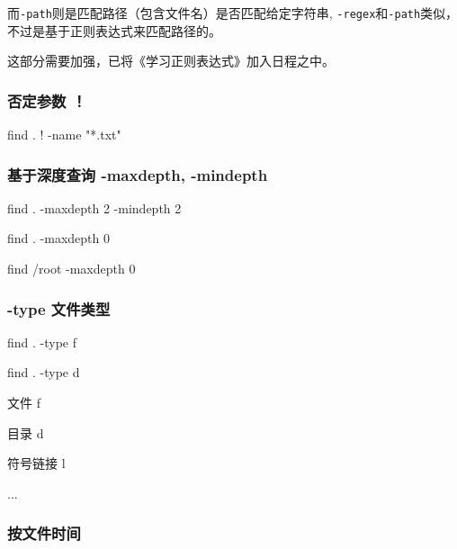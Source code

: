 而\lstinline$-path$则是匹配路径（包含文件名）是否匹配给定字符串, \lstinline$-regex$和\lstinline$-path$类似，不过是基于正则表达式来匹配路径的。

这部分需要加强，已将《学习正则表达式》加入日程之中。


\subsubsection{否定参数 ！}

\begin{Bash}

find . ! -name "*.txt"

\end{Bash}


\subsubsection{基于深度查询 -maxdepth, -mindepth}

\begin{Bash}[查找第二层目录的所有文件]

find . -maxdepth 2 -mindepth 2

\end{Bash}

\begin{Bash}

find . -maxdepth 0

find /root -maxdepth 0

\end{Bash}

\subsubsection{-type 文件类型}

\begin{Bash}

find . -type f 

find . -type d

\end{Bash}



文件		f

目录		d

符号链接	l

...


\subsubsection{按文件时间}



